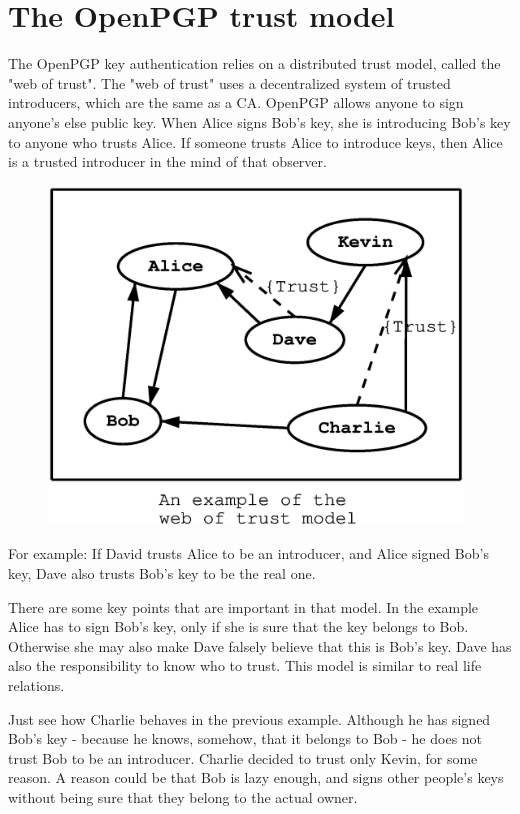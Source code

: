 \section{The OpenPGP trust model}
\label{pgp:trust}

The OpenPGP key authentication relies on a distributed trust model, called
the "web of trust". The "web of trust" uses a decentralized system of 
trusted introducers, which are the same as a CA. OpenPGP allows anyone to 
sign anyone's else public key. When Alice signs Bob's key, she is introducing 
Bob's key to anyone who trusts Alice. If someone trusts Alice to introduce
keys, then Alice is a trusted introducer in the mind of that observer.

\begin{figure}[hbtp]
\includegraphics[height=9cm,width=11cm]{pgp-fig1}
\label{fig:pgp1}
\end{figure}

For example: If David trusts Alice to be an introducer, and Alice signed
Bob's key, Dave also trusts Bob's key to be the real one.

There are some key points that are important in that model. In the example
Alice has to sign Bob's key, only if she is sure that the key belongs
to Bob. Otherwise she may also make Dave falsely believe that this
is Bob's key. Dave has also the responsibility to know who to trust.
This model is similar to real life relations.

Just see how Charlie behaves in the previous example. Although he has 
signed Bob's key - because he knows, somehow, that it belongs to Bob - 
he does not trust Bob to be an introducer. Charlie decided to trust only 
Kevin, for some reason. A reason could be that Bob is lazy enough, and 
signs other people's keys without being sure that they belong to the 
actual owner.

